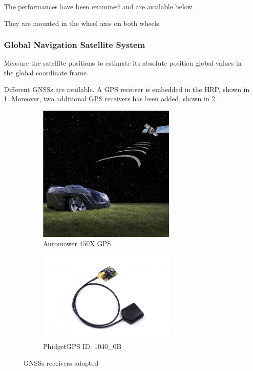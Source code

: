 The performances have been examined and are available below.

They are mounted in the wheel axis on both wheels.

\subsubsection{Global Navigation Satellite System}

\noindent Measure the satellite positions to estimate its absolute position global values in the global coordinate frame.

Different \glspl{GNSS} are available.
A \gls{GPS} receiver is embedded in the \gls{HRP}, shown in \ref{fig:autogps}.
Moreover, two additional \gls{GPS} receivers has been added, shown in \ref{fig:phigps}.

\begin{figure}[!ht]
\begin{center}
	\begin{subfigure}{.5\textwidth}
		\centering
		\includegraphics[width=0.75\textwidth]{Images/4-Methods/AutomowerGPS.jpeg}
		\caption{Automower 450X GPS}
		\label{fig:autogps}
	\end{subfigure}%
	\begin{subfigure}{.5\textwidth}
		\centering
		\includegraphics[width=0.75\textwidth]{Images/4-Methods/1040_0B_Alt2.jpg}
		\caption{PhidgetGPS ID: 1040\_0B}
		\label{fig:phigps}
	\end{subfigure}
	\caption{\glspl{GNSS} receivers adopted}
	\label{fig:gpssenso}
\end{center}
\end{figure}

